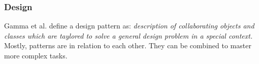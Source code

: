 %
%
%
%
%
%
%

\subsubsection{Design}
\label{design_heading}

Gamma et al. \cite{gamma1995} define a design pattern as: \textit{description of
collaborating objects and classes which are taylored to solve a general design
problem in a special context.} Mostly, patterns are in relation to each other.
They can be combined to master more complex tasks.







